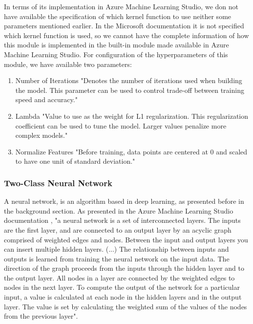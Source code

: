 In terms of its implementation in Azure Machine Learning Studio, we don not have available the specification of which kernel function to use neither some parameters mentioned earlier. In the Microsoft documentation it is not specified which kernel function is used, so we cannot have the complete information of how this module is implemented in the built-in module made available in Azure Machine Learning Studio.
For configuration of the hyperparameters of this module, we have available two parameters:
\begin{enumerate}
    \item{Number of Iterations}
"Denotes the number of iterations used when building the model. This parameter can be used to control trade-off between training speed and accuracy." \cite{AZURE_MACHINE_LEARNING}
    \item{Lambda}
"Value to use as the weight for L1 regularization. This regularization coefficient can be used to tune the model. Larger values penalize more complex models." \cite{AZURE_MACHINE_LEARNING}
    \item{Normalize Features}
"Before training, data points are centered at 0 and scaled to have one unit of standard deviation." \cite{AZURE_MACHINE_LEARNING}
\end{enumerate}

\subsubsection{Two-Class Neural Network}
A neural network, is an algorithm based in deep learning, as presented before in the background section. As presented in the Azure Machine Learning Studio documentation \cite{AZURE_MACHINE_LEARNING}, "a neural network is a set of interconnected layers. The inputs are the first layer, and are connected to an output layer by an acyclic graph comprised of weighted edges and nodes. Between the input and output layers you can insert multiple hidden layers. (...) The relationship between inputs and outputs is learned from training the neural network on the input data. The direction of the graph proceeds from the inputs through the hidden layer and to the output layer. All nodes in a layer are connected by the weighted edges to nodes in the next layer.
To compute the output of the network for a particular input, a value is calculated at each node in the hidden layers and in the output layer. The value is set by calculating the weighted sum of the values of the nodes from the previous layer".

